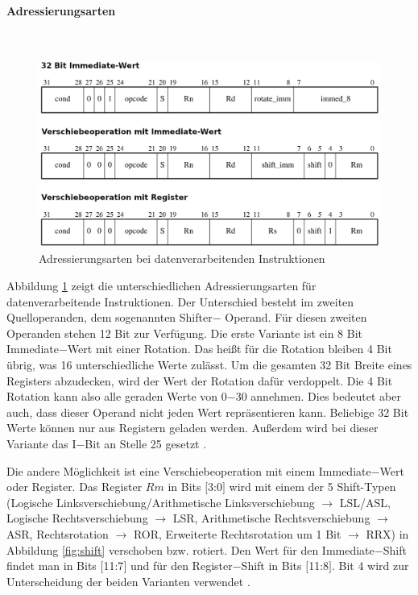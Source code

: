 \documentclass[a4paper, 11pt, onecolumn]{article}
\begin{document}
\paragraph{Adressierungsarten}\label{sec:dataInstAddr}
~\\
\begin{figure}[!htb]
\centering
\includegraphics[width=1\textwidth]{data/dataInstAddr}
\caption{Adressierungsarten bei datenverarbeitenden Instruktionen \cite{arm:2005}}
\label{fig:dataInstAddr}
\end{figure}

Abbildung \ref{fig:dataInstAddr} zeigt die unterschiedlichen Adressierungsarten für datenverarbeitende Instruktionen. Der Unterschied besteht im zweiten Quelloperanden, dem sogenannten Shifter$-$
Operand. Für diesen zweiten Operanden stehen 12 Bit zur Verfügung. Die erste Variante ist ein 8 Bit Immediate$-$Wert mit einer Rotation. Das heißt für die Rotation bleiben 4 Bit übrig, was 16 unterschiedliche Werte zulässt. Um die gesamten 32 Bit Breite eines Registers abzudecken, wird der Wert der Rotation dafür verdoppelt. Die 4 Bit Rotation kann also alle geraden Werte von 0$-$30 annehmen. Dies bedeutet aber auch, dass dieser Operand nicht jeden Wert repräsentieren kann. Beliebige 32 Bit Werte können nur aus Registern geladen werden. Außerdem wird bei dieser Variante das I$-$Bit an Stelle 25 gesetzt \cite{arm:2005}.

Die andere Möglichkeit ist eine Verschiebeoperation mit einem Immediate$-$Wert oder Register. Das Register $Rm$ in Bits $[$3:0$]$ wird mit einem der 5 Shift-Typen (Logische Linksverschiebung/Arithmetische Linksverschiebung $\rightarrow$ LSL/ASL, Logische Rechtsverschiebung $\rightarrow$ LSR, Arithmetische Rechtsverschiebung $\rightarrow$ ASR, Rechtsrotation $\rightarrow$ ROR, Erweiterte Rechtsrotation um 1 Bit $\rightarrow$ RRX) in Abbildung \ref{fig:shift} verschoben bzw. rotiert. Den Wert für den Immediate$-$Shift findet man in Bits $[$11:7$]$ und für den Register$-$Shift in Bits $[$11:8$]$. Bit 4 wird zur Unterscheidung der beiden Varianten verwendet \cite{arm:2005}.
\end{document}
